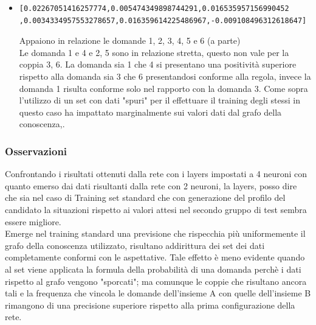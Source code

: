 \documentclass[10pt,a4paper]{article}
\begin{document}
\begin{itemize}
\item  \begin{verbatim}[0.02267051416257774,0.005474349898744291,0.016535957156990452
,0.0034334957553278657,0.016359614225486967,-0.009108496312618647]\end{verbatim}
Appaiono in relazione le domande 1, 2, 3, 4, 5  e 6 (a parte)\\
Le domanda 1 e 4 e 2, 5  sono in relazione stretta, questo non vale per la coppia 3, 6. La domanda sia 1 che 4 si presentano una positivit\`a superiore rispetto alla domanda sia 3 che 6 presentandosi conforme alla regola, invece la domanda 1 risulta conforme solo nel rapporto con la domanda 3. Come sopra l'utilizzo di  un set con dati "spuri" per il effettuare il training degli stessi in questo caso ha impattato marginalmente sui valori dati dal grafo della conoscenza,.
\end{itemize}

\subsubsection{Osservazioni}
\label{Osservazioni su rete a 2 neuroni}

Confrontando i risultati ottenuti dalla rete con i layers impostati a 4 neuroni con quanto emerso dai dati risultanti dalla  rete con 2 neuroni, la layers, posso dire che sia nel caso di Training set standard che con generazione del profilo del candidato la situazioni rispetto ai valori attesi nel secondo gruppo di test sembra essere migliore.\\
Emerge nel training standard una previsione che rispecchia pi\`u uniformemente il grafo della conoscenza utilizzato, risultano  addirittura dei set dei dati completamente conformi con le aspettative. Tale effetto \`e meno evidente quando al set viene applicata la formula della probabilit\`a di una domanda perch\`e i dati rispetto al grafo vengono "sporcati"; ma comunque le coppie che risultano ancora tali e la frequenza che vincola le domande dell'insieme A con quelle dell'insieme B rimangono di una precisione superiore rispetto alla prima configurazione della rete.
\end{document}
